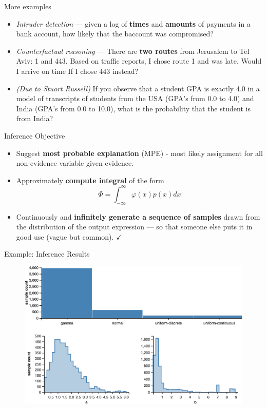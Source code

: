 \documentclass{beamer}
\begin{document}
\begin{frame}{More examples}
    \begin{itemize}
        \item \textit{Intruder detection} --- 
            given a log of \textbf{times} and \textbf{amounts} of
            payments in a bank account, how likely that the baccount was
            compromised?
        \pause
        \item \textit{Counterfactual reasoning} --- There are
            \textbf{two routes} from Jerusalem to Tel Aviv:
            1 and 443.  Based on traffic reports, I chose route
            1 and was late. Would I arrive on time If I chose 443
            instead?
        \pause 
        \item \textit{(Due to Stuart Russell)} If you observe that a
            student GPA is exactly 4.0 in a model of
            transcripts of students from the USA (GPA's from
            0.0 to 4.0) and India (GPA's from 0.0 to
            10.0), what is the probability that the student
            is from India? 
    \end{itemize}
\end{frame}

\begin{frame}{Inference Objective}
\begin{itemize}
\item Suggest \textbf{most probable explanation} (MPE) - most likely assignment
  for all non-evidence variable given evidence.
  \pause
\item Approximately \textbf{compute integral} of the
  form $$\Phi=\int_{-\infty}^{\infty} \varphi(x)p(x) dx$$
  \pause
\item Continuously and \textbf{infinitely generate a sequence of samples} drawn
  from the distribution of the output expression --- so that someone
  else puts it in good use (vague but common). $\checkmark$
\end{itemize}
\end{frame}

\begin{frame}{Example: Inference Results}
  \begin{figure}[H]
      \includegraphics[scale=0.6]{models-results.pdf}
  \end{figure}
\end{frame}
\end{document}
